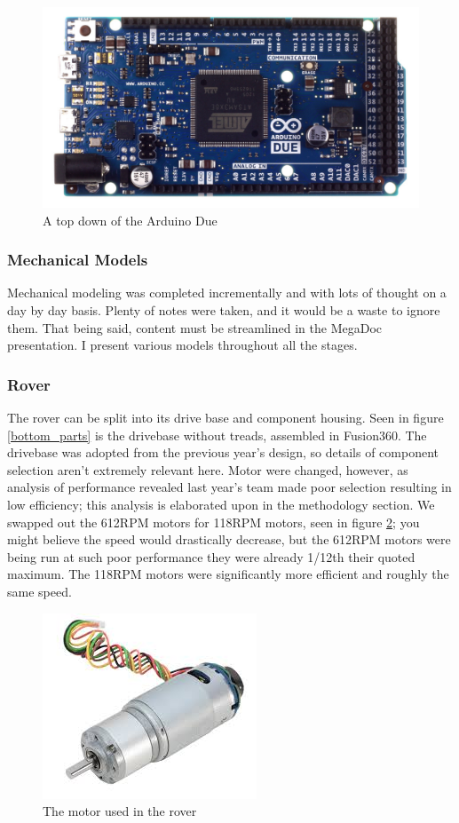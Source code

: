 \documentclass[a4paper, 10pt]{article}
\begin{document}
 		\begin{figure} [!h]
			\centering
			\includegraphics[scale=0.2]{Photos/arduino_due}
			\caption{A top down of the Arduino Due}
			\label{arduino_due}
		\end{figure}
 
 		\subsubsection{Mechanical Models}
 		Mechanical modeling was completed incrementally and with lots of thought on a day by day basis. Plenty of notes were taken, and it would be a waste to ignore them. That being said, content must be streamlined in the MegaDoc presentation. I present various models throughout all the stages.
 		
 		\subsubsection*{Rover}
		The rover can be split into its drive base and component housing. Seen in figure \ref{bottom_parts} is the drivebase without treads, assembled in Fusion360. The drivebase was adopted from the previous year's design, so details of component selection aren't extremely relevant here. Motor were changed, however, as analysis of performance revealed last year's team made poor selection resulting in low efficiency; this analysis is elaborated upon in the methodology section. We swapped out the 612RPM motors for 118RPM motors, seen in figure \ref{motors}; you might believe the speed would drastically decrease, but the 612RPM motors were being run at such poor performance they were already 1/12th their quoted maximum. The 118RPM motors were significantly more efficient and roughly the same speed.
		
		\begin{figure} [h]
			\centering
			\includegraphics[scale=1]{Photos/Gear motor 12V planetary}
			\caption{The motor used in the rover}
			\label{motors}
		\end{figure}
		
\end{document}
